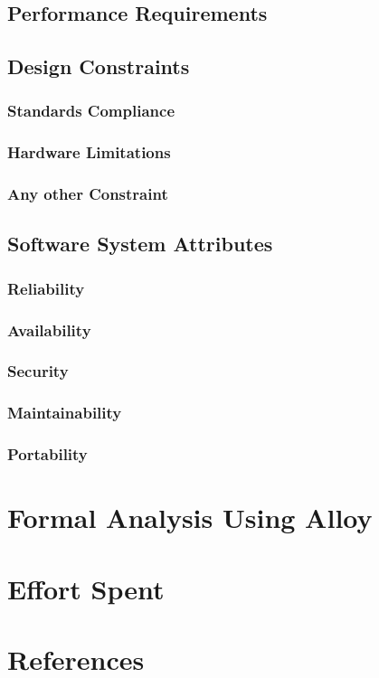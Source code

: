 \documentclass[a4paper]{article}
\begin{document}
\subsection{Performance Requirements}

\subsection{Design Constraints}

\subsubsection{Standards Compliance}

\subsubsection{Hardware Limitations}

\subsubsection{Any other Constraint}

\subsection{Software System Attributes}

\subsubsection{Reliability}

\subsubsection{Availability}

\subsubsection{Security}

\subsubsection{Maintainability}

\subsubsection{Portability}

\section{Formal Analysis Using Alloy}

\section{Effort Spent}

\section{References}
\end{document}
